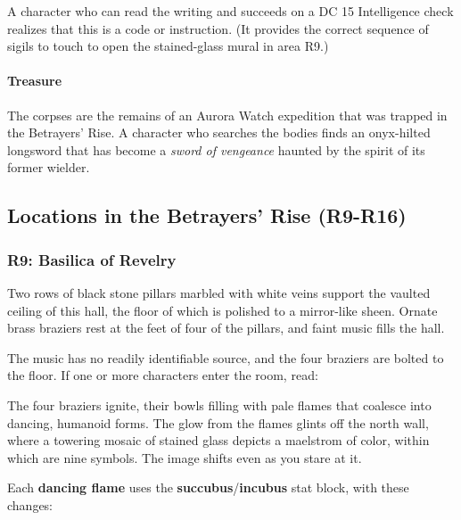 \documentclass[a4paper, 11pt, bg=full, twocolumn, nooutline]{dndbook}
\begin{document}
A character who can read the writing and succeeds on a DC 15 Intelligence check realizes that this is a code or instruction. (It provides the correct sequence of sigils to touch to open the stained-glass mural in area R9.)

\paragraph{Treasure}

The corpses are the remains of an Aurora Watch expedition that was trapped in the Betrayers' Rise. A character who searches the bodies finds an onyx-hilted longsword that has become a \textit{sword of vengeance} haunted by the spirit of its former wielder.

\subsection{Locations in the Betrayers' Rise (R9-R16)}

\subsubsection{R9: Basilica of Revelry}

\begin{DndReadAloud}
Two rows of black stone pillars marbled with white veins support the vaulted ceiling of this hall, the floor of which is polished to a mirror-like sheen. Ornate brass braziers rest at the feet of four of the pillars, and faint music fills the hall.
\end{DndReadAloud}

The music has no readily identifiable source, and the four braziers are bolted to the floor. If one or more characters enter the room, read:

\begin{DndReadAloud}
The four braziers ignite, their bowls filling with pale flames that coalesce into dancing, humanoid forms. The glow from the flames glints off the north wall, where a towering mosaic of stained glass depicts a maelstrom of color, within which are nine symbols. The image shifts even as you stare at it.
\end{DndReadAloud}

Each \textbf{dancing flame} uses the \textbf{succubus}/\textbf{incubus} stat block, with these changes:

\end{document}
